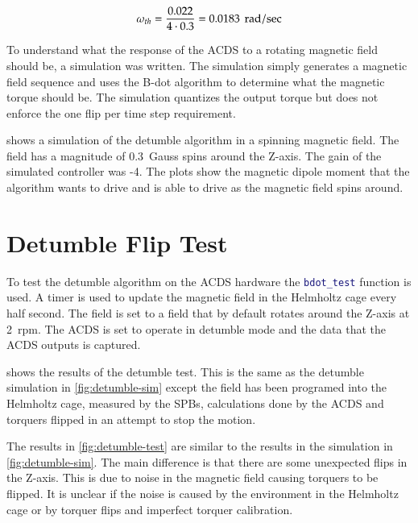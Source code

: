 \begin{equation}
    \omega _ {th} = { 0.022 \over{ {4 \cdot 0.3}}} = 0.0183 ~ \, \mathrm{rad / sec}
\end{equation}

To understand what the response of the \ac{ACDS} to a rotating magnetic field should be, a simulation was written. The simulation simply generates a magnetic field sequence and uses the B-dot algorithm to determine what the magnetic torque should be. The simulation quantizes the output torque but does not enforce the one flip per time step requirement.


 shows a simulation of the detumble algorithm in a spinning magnetic field. The field has a magnitude of 0.3~Gauss spins around the Z-axis. The gain of the simulated controller was -4. The plots show the magnetic dipole moment that the algorithm wants to drive and is able to drive as the magnetic field spins around.


\section{Detumble Flip Test}

To test the detumble algorithm on the \ac{ACDS} hardware the \lstinline[style=code,language=Matlab]$bdot_test$ function is used. A timer is used to update the magnetic field in the Helmholtz cage every half second. The field is set to a field that by default rotates around the Z-axis at 2~rpm. The \ac{ACDS} is set to operate in detumble mode and the data that the \ac{ACDS} outputs is captured.


 shows the results of the detumble test. This is the same as the detumble simulation in \cref{fig:detumble-sim} except the field has been programed into the Helmholtz cage, measured by the \acp{SPB}, calculations done by the \ac{ACDS} and torquers flipped in an attempt to stop the motion.

The results in \cref{fig:detumble-test} are similar to the results in the simulation in \cref{fig:detumble-sim}. The main difference is that there are some unexpected flips in the Z-axis. This is due to noise in the magnetic field causing torquers to be flipped. It is unclear if the noise is caused by the environment in the Helmholtz cage or by torquer flips and imperfect torquer calibration.


